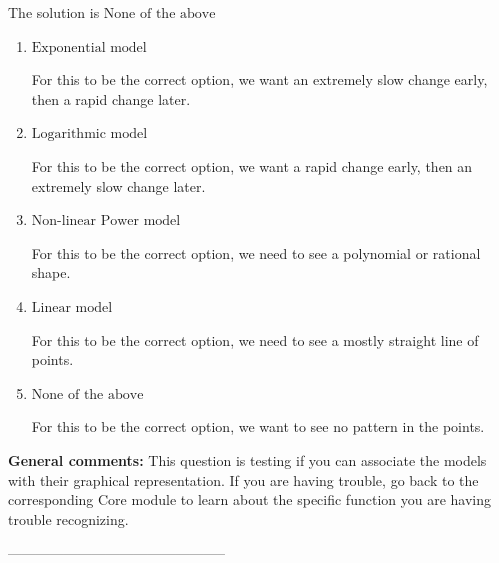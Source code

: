 \documentclass{extbook}[14pt]
\begin{document}
The solution is $ \text{None of the above} $ 

\begin{enumerate}[label=\Alph*.] 
\item $ \text{Exponential model} $ 

 For this to be the correct option, we want an extremely slow change early, then a rapid change later. 
\item $ \text{Logarithmic model} $ 

 For this to be the correct option, we want a rapid change early, then an extremely slow change later. 
\item $ \text{Non-linear Power model} $ 

 For this to be the correct option, we need to see a polynomial or rational shape. 
\item $ \text{Linear model} $ 

 For this to be the correct option, we need to see a mostly straight line of points. 
\item $ \text{None of the above} $ 

 For this to be the correct option, we want to see no pattern in the points. 
\end{enumerate} 
 
\textbf{General comments:} This question is testing if you can associate the models with their graphical representation. If you are having trouble, go back to the corresponding Core module to learn about the specific function you are having trouble recognizing.

-----------------------------------------------
\end{document}
